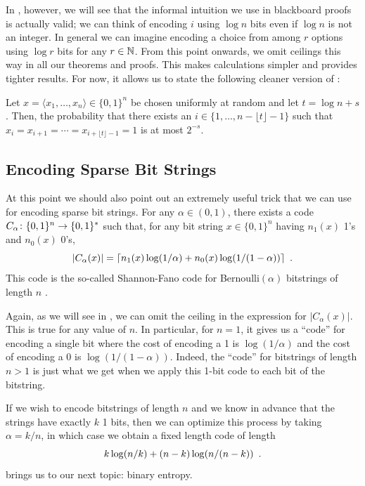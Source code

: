 \documentclass{patmorin}
\newenvironment{customthm}[1]
  {\renewcommand\theinnercustomthm{#1}\innercustomthm}
  {\endinnercustomthm}
\begin{document}
In , however, we will see that the informal intuition
we use in blackboard proofs is actually valid; we can think of
encoding $i$ using $\log n$ bits even if $\log n$ is not an integer.
In general we can imagine encoding a choice from among $r$ options
using $\log r$ bits for any $r\in\mathbb{N}$.  From this point onwards, we
omit ceilings this way in all our theorems and proofs. This makes
calculations simpler and provides tighter results.  For now, it allows
us to state the following cleaner version of :

\begin{customthm}{\ref{thm:runs-i}b}
  Let $x=\langle x_1,\ldots,x_n\rangle\in\{0,1\}^n$ be chosen
  uniformly at random and let $t= \log n + s$. Then, the
  probability that there exists an $i\in\{1,\ldots,n-\lfloor t\rfloor-1\}$ such that
  $x_i=x_{i+1}=\cdots=x_{i+\lfloor t\rfloor-1}=1$ is at most $2^{-s}$.
\end{customthm}

\subsection{Encoding Sparse Bit Strings}

At this point we should also point out an extremely useful trick that
we can use for encoding sparse bit strings. For any $\alpha\in(0,1)$,
there exists a code $C_\alpha\colon \{0,1\}^n\rightarrow \{0,1\}^*$
such that, for any bit string $x\in\{0,1\}^n$ having $n_1(x)$ 1's and
$n_0(x)$ 0's,
\begin{equation}
  |C_\alpha(x)| = \lceil n_1(x)\log(1/\alpha) + n_0(x)\log(1/(1-\alpha)) \rceil \enspace .
  \eqlabel{sparse-bitstring-i}
\end{equation}
This code is the so-called Shannon-Fano code for Bernoulli$(\alpha)$
bitstrings of length $n$
\cite{fano:transmission,shannon:mathematical}.

Again, as we will see in , we can omit the ceiling in
the expression for $|C_\alpha(x)|$.  This is true for any value of
$n$. In particular, for $n=1$, it gives us a ``code'' for encoding a
single bit where the cost of encoding a 1 is $\log(1/\alpha)$ and the
cost of encoding a 0 is $\log(1/(1-\alpha))$.  Indeed, the ``code''
for bitstrings of length $n>1$ is just what we get when we apply this
1-bit code to each bit of the bitstring.

If we wish to encode bitstrings of length $n$ and we know in advance
that the strings have exactly $k$ 1 bits, then we can optimize this
process by taking $\alpha=k/n$, in which case we obtain a fixed length
code of length
\begin{equation}
    k\log (n/k) + (n-k)\log(n/(n-k))  \eqlabel{sparse-bitstring-ii} \enspace .
\end{equation}
 brings us to our next topic: binary entropy.
\end{document}
